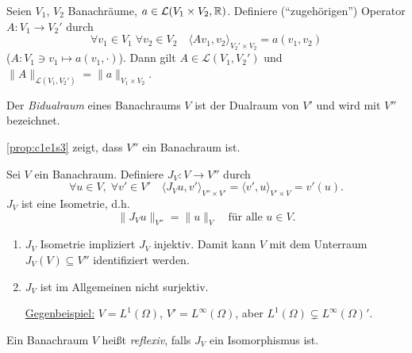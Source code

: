 \documentclass[../skript.tex]{subfiles}
\begin{document}
\begin{proposition} %
\label{prop:c1e2s5}
Seien $V_1$, $V_2$ Banachräume, $a \in \mathcal{L}(V_1 \times V_2, \mathbb{R})$. Definiere (``zugehörigen'') Operator $A : V_1 \to V_2'$ durch
\[
	\forall v_1 \in V_1 \; \forall v_2 \in V_2 \quad \langle A v_1, v_2 \rangle_{V_2' \times V_2} = a(v_1, v_2)
\]
($A : V_1 \ni v_1 \mapsto a(v_1, \cdot)$).
Dann gilt $A \in \mathcal{L}(V_1, V_2')$ und $\| A \|_{\mathcal{L}(V_1, V_2')} = \| a \|_{V_1 \times V_2}$.
\end{proposition}
\begin{definition}[Bidualraum] %
\label{def:c1e2s6}
Der \emph{Bidualraum} eines Banachraums $V$ ist der Dualraum von $V'$ und wird mit $V''$ bezeichnet.
\end{definition}
\begin{remark} %
\label{bem:c1e2s7}
\cref{prop:c1e1s3} zeigt, dass $V''$ ein Banachraum ist.
\end{remark}
\begin{proposition} %
\label{prop:c1e2s8}
Sei $V$ ein Banachraum. Definiere $J_V : V \to V''$ durch
\[
	\forall u \in V, \; \forall v' \in V' \quad \langle J_V u, v' \rangle_{V'' \times V'} = \langle v', u \rangle_{V' \times V} = v'(u).
\]
$J_V$ ist eine Isometrie, d.h.
\[
	\| J_V u \|_{V''} = \| u \|_{V} \quad \text{für alle } u \in V.
\]
\end{proposition}
\begin{remark} %
\label{bem:c1e2s9}
\begin{enumerate}
\item $J_V$ Isometrie impliziert $J_V$ injektiv. Damit kann $V$ mit dem Unterraum $J_V(V) \subseteq V''$ identifiziert werden.
\item $J_V$ ist im Allgemeinen nicht surjektiv. \par 
\underline{Gegenbeispiel:} $V = L^1(\Omega)$, $V' = L^\infty(\Omega)$, aber $L^1(\Omega) \subsetneq L^\infty(\Omega)'$.
\end{enumerate}
\end{remark}
\begin{definition} %
\label{def:c1e2s10}
Ein Banachraum $V$ heißt \emph{reflexiv}, falls $J_V$ ein Isomorphismus ist.
\end{definition}
\end{document}
